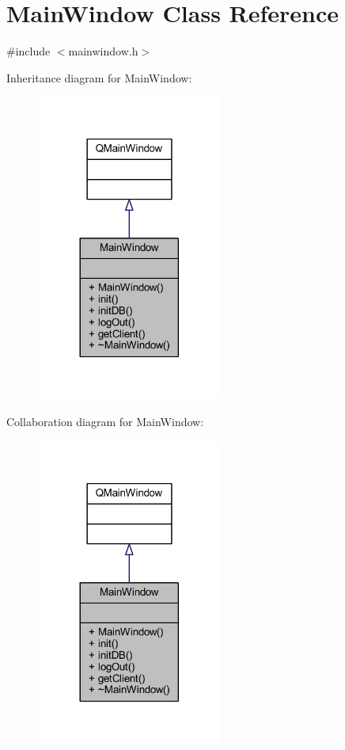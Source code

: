 \hypertarget{class_main_window}{}\section{Main\+Window Class Reference}
\label{class_main_window}


{\ttfamily \#include $<$mainwindow.\+h$>$}



Inheritance diagram for Main\+Window\+:
\nopagebreak
\begin{figure}[H]
\begin{center}
\leavevmode
\includegraphics[width=173pt]{class_main_window__inherit__graph}
\end{center}
\end{figure}


Collaboration diagram for Main\+Window\+:
\nopagebreak
\begin{figure}[H]
\begin{center}
\leavevmode
\includegraphics[width=173pt]{class_main_window__coll__graph}
\end{center}
\end{figure}
